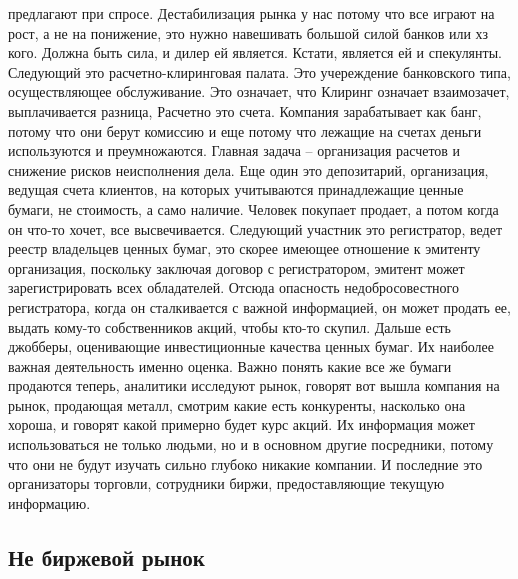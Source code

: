 \documentclass[a4paper, 12pt]{article}
\begin{document}
предлагают при спросе. Дестабилизация рынка у нас потому что все играют на рост, а не на понижение, это нужно навешивать большой силой банков или хз кого. Должна быть сила, и дилер ей является. Кстати, является ей и спекулянты. Следующий это расчетно-клиринговая палата. Это учереждение банковского типа, осуществляющее обслуживание. Это означает, что Клиринг означает взаимозачет, выплачивается разница, Расчетно это счета. Компания зарабатывает как банг, потому что они берут комиссию и еще потому что лежащие на счетах деньги используются и преумножаются. Главная задача -- организация расчетов и снижение рисков неисполнения дела. Еще один это депозитарий, организация, ведущая счета клиентов, на которых учитываются принадлежащие ценные бумаги, не стоимость, а само наличие. Человек покупает продает, а потом когда он что-то хочет, все высвечивается. Следующий участник это регистратор, ведет реестр владельцев ценных бумаг, это скорее имеющее отношение к эмитенту организация, поскольку заключая договор с регистратором, эмитент может зарегистрировать всех обладателей. Отсюда опасность недобросовестного регистратора, когда он сталкивается с важной информацией, он может продать ее, выдать кому-то собственников акций, чтобы кто-то скупил. Дальше есть джобберы, оценивающие инвестиционные качества ценных бумаг. Их наиболее важная деятельность именно оценка. Важно понять какие все же бумаги продаются теперь, аналитики исследуют рынок, говорят вот вышла компания на рынок, продающая металл, смотрим какие есть конкуренты, насколько она хороша, и говорят какой примерно будет курс акций. Их информация может использоваться не только людьми, но и в основном другие посредники, потому что они не будут изучать сильно глубоко никакие компании. И последние это организаторы торговли, сотрудники биржи, предоставляющие текущую информацию. 

\subsection{Не биржевой рынок}
\end{document}
